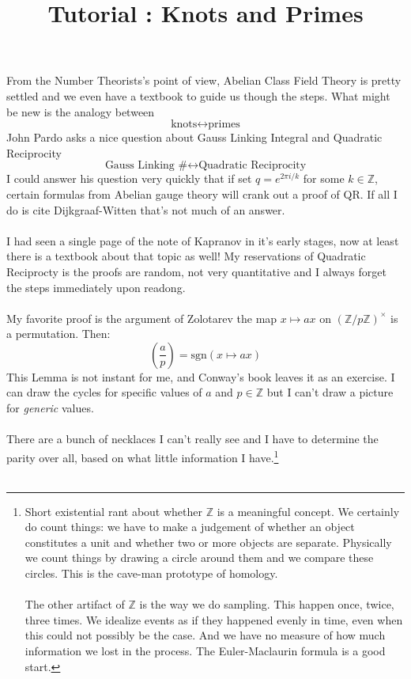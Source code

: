 \documentclass[12pt]{article}
\title{Tutorial : Knots and Primes}
\date{}
\begin{document}
\selectfont \fontsize{12.5}{15}\selectfont

\maketitle

\noindent From the Number Theorists's point of view, Abelian Class Field Theory is pretty settled and we even have a textbook to guide us though the steps.  What might be new is the analogy between 
$$ \text{knots} \leftrightarrow \text{primes} $$
John Pardo asks a nice question about Gauss Linking Integral and Quadratic Reciprocity
$$ \text{Gauss Linking \#} \leftrightarrow \text{Quadratic Reciprocity}  $$
I could answer his question very quickly that if set $q= e^{2\pi i /k}$ for some $k \in \mathbb{Z}$, certain formulas from Abelian gauge theory will crank out a proof of QR.  If all I do is cite Dijkgraaf-Witten that's not much of an answer.  \\ \\
I had seen a single page of the note of Kapranov in it's early stages, now at least there is a textbook about that topic as well! My reservations of Quadratic Reciprocty is the proofs are random, not very quantitative and I always forget the steps immediately upon readong. \\ \\
My favorite proof is the argument of Zolotarev the map $x \mapsto ax$ on $(\mathbb{Z}/p\mathbb{Z})^\times$ is a permutation.  Then:
$$ \left( \frac{a}{p} \right) = \text{sgn} (x \mapsto ax) $$
This Lemma is not instant for me, and Conway's book leaves it as an exercise. I can draw the cycles for specific values of $a$ and $p \in \mathbb{Z}$ but I can't draw a picture for \textit{generic} values. \\ \\
There are a bunch of necklaces I can't really see and I have to determine the parity over all, based on what little information I have.\footnote{
Short existential rant about whether $\mathbb{Z}$ is a meaningful concept.  We certainly do count things: we have to make a judgement of whether an object constitutes a unit and whether two or more objects are separate.  Physically we count things by drawing a circle around them and we compare these circles.  This is the cave-man prototype of homology. \\ \\
The other artifact of $\mathbb{Z}$ is the way we do sampling.  This happen once, twice, three times.  We idealize events as if they happened evenly in time, even when this could not possibly be the case.  And we have no measure of how much information we lost in the process. The Euler-Maclaurin formula is a good start.} \\ \\
\end{document}
